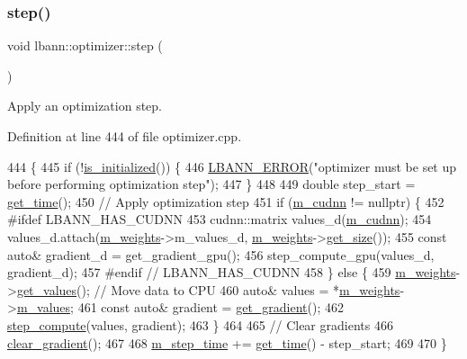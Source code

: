 \subsubsection{\texorpdfstring{step()}{step()}}
{\footnotesize\ttfamily void lbann\+::optimizer\+::step (\begin{DoxyParamCaption}{ }\end{DoxyParamCaption})}

Apply an optimization step. 

Definition at line 444 of file optimizer.\+cpp.


\begin{DoxyCode}
444                      \{
445   \textcolor{keywordflow}{if} (!\hyperlink{classlbann_1_1optimizer_abccf0babf69e3d7c6e9a7fd0731c79b7}{is\_initialized}()) \{
446     \hyperlink{base_8hpp_a80b1d707117e968a6951b7222e4b2b87}{LBANN\_ERROR}(\textcolor{stringliteral}{"optimizer must be set up before performing optimization step"});
447   \}
448 
449   \textcolor{keywordtype}{double} step\_start = \hyperlink{namespacelbann_a478d36031ff0659893c4322cd856157f}{get\_time}();
450   \textcolor{comment}{// Apply optimization step}
451   \textcolor{keywordflow}{if} (\hyperlink{classlbann_1_1optimizer_a2f24dbeaca18b06f4aa7d179bbf96680}{m\_cudnn} != \textcolor{keyword}{nullptr}) \{
452 \textcolor{preprocessor}{  #ifdef LBANN\_HAS\_CUDNN}
453     cudnn::matrix values\_d(\hyperlink{classlbann_1_1optimizer_a2f24dbeaca18b06f4aa7d179bbf96680}{m\_cudnn});
454     values\_d.attach(\hyperlink{classlbann_1_1optimizer_a33b57b578a089d9ffe6715bb3996907c}{m\_weights}->m\_values\_d, \hyperlink{classlbann_1_1optimizer_a33b57b578a089d9ffe6715bb3996907c}{m\_weights}->\hyperlink{classlbann_1_1weights_a3216926df0aaf7aa440b9e5317d05fa2}{get\_size}());
455     \textcolor{keyword}{const} \textcolor{keyword}{auto}& gradient\_d = get\_gradient\_gpu();
456     step\_compute\_gpu(values\_d, gradient\_d);
457 \textcolor{preprocessor}{  #endif // LBANN\_HAS\_CUDNN}
458   \} \textcolor{keywordflow}{else} \{
459     \hyperlink{classlbann_1_1optimizer_a33b57b578a089d9ffe6715bb3996907c}{m\_weights}->\hyperlink{classlbann_1_1weights_a09fa4082be905c0c124dde3033e2461b}{get\_values}(); \textcolor{comment}{// Move data to CPU}
460     \textcolor{keyword}{auto}& values = *\hyperlink{classlbann_1_1optimizer_a33b57b578a089d9ffe6715bb3996907c}{m\_weights}->\hyperlink{classlbann_1_1weights_a6b2df671b6d4c4dd595477971eea0543}{m\_values};
461     \textcolor{keyword}{const} \textcolor{keyword}{auto}& gradient = \hyperlink{classlbann_1_1optimizer_a12b7dbc72eb2de78d6ad798b8939f349}{get\_gradient}();
462     \hyperlink{classlbann_1_1optimizer_a0db72c298a0bc3405fb0af97d104a036}{step\_compute}(values, gradient);
463   \}
464 
465   \textcolor{comment}{// Clear gradients}
466   \hyperlink{classlbann_1_1optimizer_a3f41360479fbd46c704342bb4ef36d09}{clear\_gradient}();
467 
468   \hyperlink{classlbann_1_1optimizer_afc424c715008fb4d900548f7934ea856}{m\_step\_time} += \hyperlink{namespacelbann_a478d36031ff0659893c4322cd856157f}{get\_time}() - step\_start;
469 
470 \}
\end{DoxyCode}

